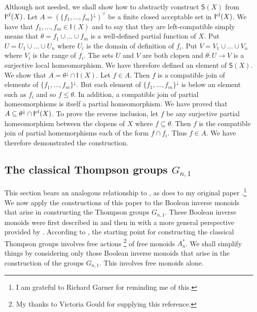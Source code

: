 \documentclass[a4paper]{amsart}
\begin{document}
Although not needed, we shall show how to abstractly construct  $\mathsf{S}(X)$ from $\mathsf{I}^{\tiny cl}(X)$.
Let $A = (\{f_{1},\ldots, f_{m}\}^{\downarrow})^{\vee}$ be a finite closed acceptable set in $\mathsf{I}^{\tiny cl}(X)$.
We have that $f_{1},\ldots, f_{m} \in \mathsf{I}(X)$
and to say that they are left-compatible simply means that $\theta = f_{1} \cup \ldots \cup f_{m}$ is a well-defined
partial function of $X$.
Put $U = U_{1} \cup \ldots \cup U_{n}$ where $U_{i}$ is the domain of definition of $f_{i}$.
Put $V = V_{1} \cup \ldots \cup V_{n}$ where $V_{i}$ is the range of $f_{i}$.
The sets $U$ and $V$ are both clopen and $\theta \colon U \rightarrow V$
is a surjective local homeomorphism.
We have therefore defined an element of $\mathsf{S}(X)$.
We show that $A = \theta^{\downarrow} \cap  \mathsf{I}(X)$.
Let $f \in A$.
Then $f$ is a compatible join of elements of 
$\{f_{1},\ldots, f_{m}\}^{\downarrow}$. 
But each element of
$\{f_{1},\ldots, f_{m}\}^{\downarrow}$
is below an element such as $f_{i}$ and so $f \leq \theta$.
In addition, a compatible join of partial homeomorphisms is itself a partial homeomorphism.
We have proved that $A \subseteq  \theta^{\downarrow} \cap  \mathsf{I}^{\tiny cl}(X)$.
To prove the reverse inclusion, let $f$ be any surjective partial homeomorphism between the clopens of $X$ where $f \subseteq \theta$.
Then $f$ is the compatible join of partial homemorphisms each of the form $f \cap f_{i}$.
Thus $f \in A$.
We have therefore demonstrated the construction.

\subsection{The classical Thompson groups $G_{n,1}$} 

This section bears an analogous relationship to \cite{Birget2009},
as \cite{Birget2004} does to my original paper \cite{Lawson2007b}.\footnote{I am grateful to Richard Garner for reminding me of this.}
We now apply the constructions of this paper to the Boolean inverse monoids that arise
in constructing the Thompson groups $G_{n,1}$.
These Boolean inverse monoids were first described in \cite{Lawson2007b}
and then in \cite{LS1} with a more general perspective provided by \cite{Lawson2021b}.
According to \cite{Scott}, the starting point for constructing the classical Thompson groups  
involves free actions \cite{KKM}\footnote{My thanks to Victoria Gould for supplying this reference.} of free monoids $A_{n}^{\ast}$. 
We shall simplify things by considering only those Boolean inverse monoids that arise in the construction of the groups $G_{n,1}$.
This involves free monoids alone.
\end{document}
